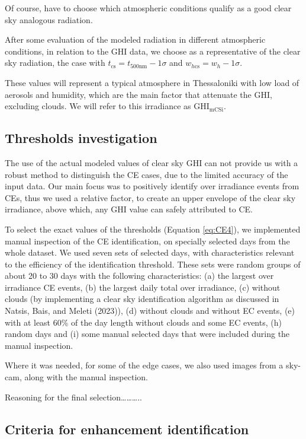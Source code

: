 \documentclass[
]{article}
\begin{document}
Of course, have to choose which atmospheric conditions qualify as a good clear sky analogous radiation.

After some evaluation of the modeled radiation in different atmospheric conditions,
in relation to the GHI data, we choose as a representative of the clear sky radiation,
the case with
\(t_{\text{cs}} = t_{500\text{nm}} - 1\sigma\) and \(w_{h\text{cs}} = w_h - 1\sigma\).

These values will represent a typical atmosphere in
Thessaloniki with low load of aerosols and humidity, which are the main factor that
attenuate the GHI, excluding clouds.
We will refer to this irradiance as \(\text{GHI}_\text{mCSi}\).

\hypertarget{thresholds-investigation}{%
\subsection{Thresholds investigation}\label{thresholds-investigation}}

The use of the actual modeled values of clear sky GHI can not provide us with a
robust method to distinguish the CE cases, due to the limited accuracy of the input
data. Our main focus was to positively identify over irradiance events from CEs,
thus we used a relative factor, to create an upper envelope of the clear sky
irradiance, above which, any GHI value can safely attributed to CE.

To select the exact values of the thresholds (Equation \ref{eq:CE4}), we implemented
manual inspection of the CE identification, on specially selected days from the whole
dataset. We used seven sets of selected days, with characteristics relevant to the
efficiency of the identification threshold. These sets were random groups of about
20 to 30 days with the following characteristics:
(a) the largest over irradiance CE events,
(b) the largest daily total over irradiance,
(c) without clouds (by implementing a clear sky identification algorithm as discussed in Natsis, Bais, and Meleti (2023)),
(d) without clouds and without EC events,
(e) with at least \(60\%\) of the day length without clouds and some EC events,
(h) random days and
(i) some manual selected days that were included during the manual inspection.

Where it was needed, for some of the edge cases, we also used images from a sky-cam,
along with the manual inspection.

Reasoning for the final selection\ldots\ldots\ldots..

\hypertarget{criteria-for-enhancement-identification}{%
\subsection{Criteria for enhancement identification}\label{criteria-for-enhancement-identification}}
\end{document}
